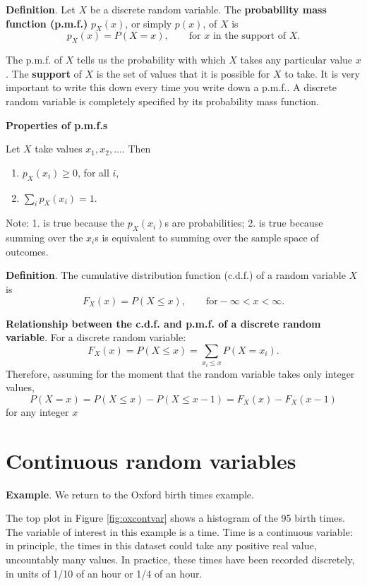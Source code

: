 \documentclass[
  british,
  11pt,
  openany, a4paper]{book}
\providecommand{\tightlist}{%
  \setlength{\itemsep}{0pt}\setlength{\parskip}{0pt}}
\begin{document}
\textbf{Definition}. Let \(X\) be a discrete random variable. The \textbf{probability mass function (p.m.f.)} \(p_X(x)\), or simply \(p(x)\), of \(X\) is
\[p_X(x) = P(X=x), \qquad \text{for } x \text{ in the support of } X.\]

The p.m.f. of \(X\) tells us the probability with which \(X\) takes any particular value \(x\). The \textbf{support} of \(X\) is the set of values that it is possible for \(X\) to take. It is very important to write this down every time you write down a p.m.f.. A discrete random variable is completely specified by its probability mass function.

\textbf{Properties of p.m.f.s}

Let \(X\) take values \(x_1, x_2,\ldots.\) Then

\begin{enumerate}
\def\labelenumi{\arabic{enumi}.}
\tightlist
\item
  \(p_X(x_i) \geq 0\), for all \(i\), \(\phantom{\displaystyle\sum_i}\)
\item
  \(\displaystyle\sum_i p_X(x_i) = 1\).
\end{enumerate}

Note: 1. is true because the \(p_X(x_i)\)s are probabilities; 2. is true because summing over the \(x_i\)s is equivalent to summing over the sample space of outcomes.

\textbf{Definition}. The cumulative distribution function (c.d.f.) of a random variable \(X\) is
\[ F_X(x) = P(X \leq x), \qquad \text{for} -\infty < x < \infty. \]

\textbf{Relationship between the c.d.f. and p.m.f. of a discrete random variable}. For a discrete random variable:
\[ F_X(x) = P(X \leq x) = \sum_{x_i \leq x} P(X = x_i). \]
Therefore, assuming for the moment that the random variable takes only integer values,
\[ P(X=x) = P(X \leq x) - P(X \leq x-1) = F_X(x) - F_X(x-1) \]
for any integer \(x\)

\section{Continuous random variables}\label{continuous}

\textbf{Example}. We return to the Oxford birth times example.

The top plot in Figure \ref{fig:oxcontvar} shows a histogram of the 95 birth times. The variable of interest in this example is a time. Time is a continuous variable: in principle, the times in this dataset could take any positive real value, uncountably many values. In practice, these times have been recorded discretely, in units of 1/10 of an hour or 1/4 of an hour.
\end{document}
